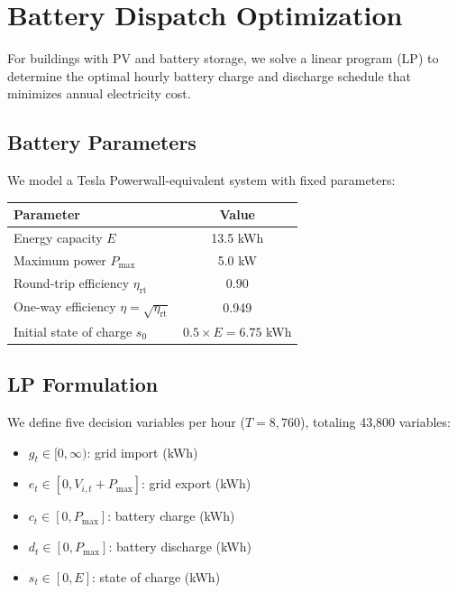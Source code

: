 \documentclass[11pt]{article}
\begin{document}
\section{Battery Dispatch Optimization}
\label{sec:battery}

For buildings with PV and battery storage, we solve a linear program (LP) to determine the optimal hourly battery charge and discharge schedule that minimizes annual electricity cost.

\subsection{Battery Parameters}

We model a Tesla Powerwall-equivalent system with fixed parameters:

\begin{table}[htbp]
\centering
\small
\begin{tabular}{l c}
\toprule
\textbf{Parameter} & \textbf{Value} \\
\midrule
Energy capacity $E$ & 13.5 kWh \\
Maximum power $P_{\max}$ & 5.0 kW \\
Round-trip efficiency $\eta_{\text{rt}}$ & 0.90 \\
One-way efficiency $\eta = \sqrt{\eta_{\text{rt}}}$ & 0.949 \\
Initial state of charge $s_0$ & $0.5 \times E = 6.75$ kWh \\
\bottomrule
\end{tabular}
\end{table}

\subsection{LP Formulation}

We define five decision variables per hour ($T = 8{,}760$), totaling 43,800 variables:

\begin{itemize}
\item $g_t \in [0, \infty)$: grid import (kWh)
\item $e_t \in [0, V_{i,t} + P_{\max}]$: grid export (kWh)
\item $c_t \in [0, P_{\max}]$: battery charge (kWh)
\item $d_t \in [0, P_{\max}]$: battery discharge (kWh)
\item $s_t \in [0, E]$: state of charge (kWh)
\end{itemize}
\end{document}
